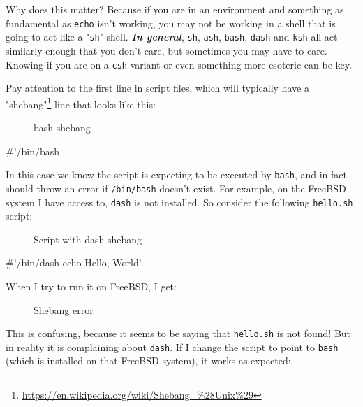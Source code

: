 \documentclass[10pt,american,]{book}
\makeatletter
\newenvironment{Shaded}{\begin{snugshade}}{\end{snugshade}}
\newcommand{\KeywordTok}[1]{\textcolor[rgb]{0.13,0.29,0.53}{\textbf{{#1}}}}
\newcommand{\CommentTok}[1]{\textcolor[rgb]{0.56,0.35,0.01}{\textit{{#1}}}}
\newcommand{\NormalTok}[1]{{#1}}
\renewcommand{\href}[2]{#2\footnote{\url{#1}}}
\numberwithin{figure}{chapter}
\DeclareRobustCommand{\drcap}[1]{\begin{figure}[H]\caption{#1}\end{figure}}
\DeclareRobustCommand{\drcmd}[1]{\index{Commands!#1@\texttt{#1}}}
\DeclareRobustCommand{\drshl}[1]{\index{Shells!#1}}
\renewcommand{\KeywordTok}[1]{{#1}}
\renewcommand{\CommentTok}[1]{{#1}}
\renewcommand{\NormalTok}[1]{{#1}}
\makeatother
\begin{document}
Why does this matter? Because if you are in an environment and something
as fundamental as \texttt{echo}\drcmd{echo} isn't working, you may not
be working in a shell that is going to act like a "\texttt{sh}" shell.
\textbf{\emph{In general}}, \texttt{sh}, \texttt{ash}, \texttt{bash},
\texttt{dash} and \texttt{ksh} all act similarly enough that you don't
care, but sometimes you may have to care. Knowing if you are on a
\texttt{csh}\drshl{csh} variant or even something more esoteric can be
key.

Pay attention to the first line in script files, which will typically
have a
\href{https://en.wikipedia.org/wiki/Shebang_\%28Unix\%29}{"shebang"}
line that looks like this:

\drcap{bash shebang}

\begin{Shaded}
\begin{Highlighting}[]
\CommentTok{#!/bin/bash}
\end{Highlighting}
\end{Shaded}

In this case we know the script is expecting to be executed by
\texttt{bash}, and in fact should throw an error if \texttt{/bin/bash}
doesn't exist. For example, on the FreeBSD system I have access to,
\texttt{dash} is not installed. So consider the following
\texttt{hello.sh} script:

\drcap{Script with dash shebang}

\begin{Shaded}
\begin{Highlighting}[]
\CommentTok{#!/bin/dash}
\KeywordTok{echo} \NormalTok{Hello, World!}
\end{Highlighting}
\end{Shaded}

When I try to run it on FreeBSD, I get:

\drcap{Shebang error}

\begin{Shaded}
\end{Shaded}

This is confusing, because it seems to be saying that \texttt{hello.sh}
is not found! But in reality it is complaining about \texttt{dash}. If I
change the script to point to \texttt{bash} (which is installed on that
FreeBSD system), it works as expected:
\end{document}
